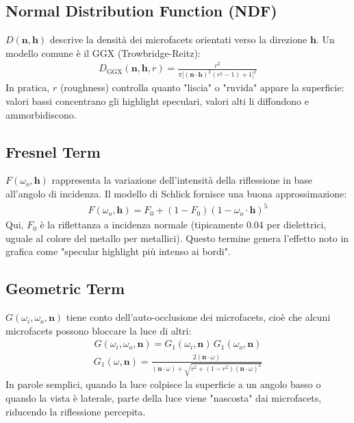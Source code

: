 \documentclass[12pt,a4paper,openright,twoside]{book}
\begin{document}
\subsection*{Normal Distribution Function (NDF)}
$D(\mathbf{n},\mathbf{h})$ descrive la densità dei microfacets orientati verso la direzione $\mathbf{h}$.  
Un modello comune è il GGX (Trowbridge-Reitz):
\begin{align*}
D_{\text{GGX}}(\mathbf{n},\mathbf{h},r) =
\frac{r^2}
{\pi \big[(\mathbf{n}\cdot\mathbf{h})^2(r^2-1)+1\big]^2}
\end{align*}
\noindent
In pratica, $r$ (roughness) controlla quanto "liscia" o "ruvida" appare la superficie: valori bassi concentrano gli
highlight speculari, valori alti li diffondono e ammorbidiscono.

\subsection*{Fresnel Term}
$F(\omega_o,\mathbf{h})$ rappresenta la variazione dell'intensità della riflessione in base all'angolo di incidenza.
Il modello di Schlick fornisce una buona approssimazione:
\begin{align*}
F(\omega_o,\mathbf{h}) = F_0 + (1 - F_0)(1 - \omega_o\cdot\mathbf{h})^5
\end{align*}
\noindent
Qui, $F_0$ è la riflettanza a incidenza normale (tipicamente 0.04 per dielettrici, uguale al colore del
metallo per metallici).
Questo termine genera l'effetto noto in grafica come "specular highlight più intenso ai bordi".

\subsection*{Geometric Term}
$G(\omega_i,\omega_o,\mathbf{n})$ tiene conto dell'auto-occlusione dei microfacets, cioè che alcuni microfacets
possono bloccare la luce di altri:
\begin{align*}
G(\omega_i,\omega_o,\mathbf{n}) = G_1(\omega_i,\mathbf{n}) \, G_1(\omega_o,\mathbf{n})
\end{align*}
\begin{align*}
G_1(\omega,\mathbf{n}) =
\frac{2(\mathbf{n}\cdot\omega)}
{(\mathbf{n}\cdot\omega) + \sqrt{r^2 + (1-r^2)(\mathbf{n}\cdot\omega)^2}}
\end{align*}
In parole semplici, quando la luce colpisce la superficie a un angolo basso o quando la vista è laterale, parte
della luce viene "nascosta" dai microfacets, riducendo la riflessione percepita.
\end{document}
